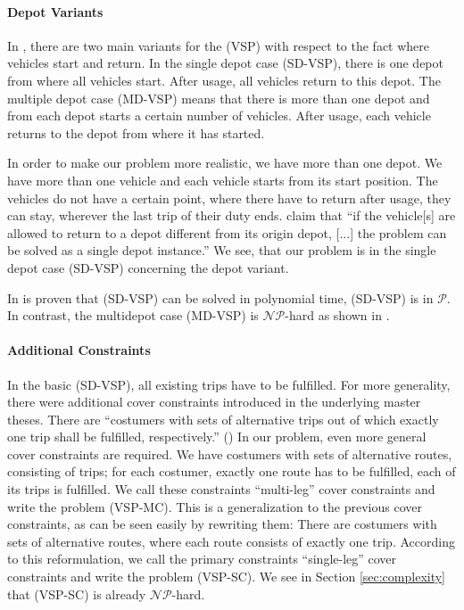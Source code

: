 \paragraph{Depot Variants} \parfill 

In \cite{Bunte_Kliewer}, there are two main variants for the (VSP) with respect to the fact where vehicles start and return. In the single depot case (SD-VSP), there is one depot from where all vehicles start. After usage, all vehicles return to this depot. The multiple depot case (MD-VSP) means that there is more than one depot and from each depot starts a certain number of vehicles. After usage, each vehicle returns to the depot from where it has started. 

In order to make our problem more realistic, we have more than one depot. We have more than one vehicle and each vehicle starts from its start position. The vehicles do not have a certain point, where there have to return after usage,  \ie they can stay, wherever the last trip of their duty ends. \cite{Daduna_Paixao} claim that ``if the vehicle[s] are allowed to return to a depot different from its origin depot, [...] the problem can be solved as a single depot instance.'' We see, that our problem is in the single depot case (SD-VSP) concerning the depot variant.

In \cite{Dantzig_Fulkerson} is proven that (SD-VSP) can be solved in polynomial time, \ie (SD-VSP) is in $\mathcal{P}$. In contrast, the multidepot case (MD-VSP) is $\mathcal{NP}$-hard as shown in \cite{Bertossi_Carraresi}.

\paragraph{Additional Constraints} \parfill

In the basic (SD-VSP), all existing trips have to be fulfilled. For more generality, there were additional cover constraints introduced in the underlying master theses. There are ``costumers with sets of alternative trips out of which exactly one trip shall be fulfilled, respectively.'' (\cite[p.10]{Kaiser_Knoll}) In our problem, even more general cover constraints are required. We have costumers with sets of alternative routes, consisting of trips; for each costumer, exactly one route has to be fulfilled, \ie each of its trips is fulfilled. We call these constraints ``multi-leg'' cover constraints and write the problem (VSP-MC). This is a generalization to the previous cover constraints, as can be seen easily by rewriting them: There are costumers with sets of alternative routes, where each route consists of exactly one trip. According to this reformulation, we call the primary constraints ``single-leg'' cover constraints and write the problem (VSP-SC). We see in Section \ref{sec:complexity} that (VSP-SC) is already $\mathcal{NP}$-hard.


